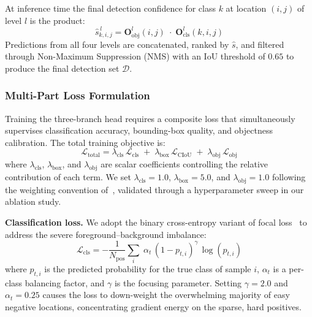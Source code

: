 At inference time the final detection confidence for class $k$
at location $(i,j)$ of level $l$ is the product:
\begin{equation}
    \hat{s}_{k,i,j}^{\,l} =
    \mathbf{O}_{\text{obj}}^{l}(i,j) \;\cdot\;
    \mathbf{O}_{\text{cls}}^{l}(k,i,j)
    \label{eq:conf}
\end{equation}
Predictions from all four levels are concatenated, ranked by
$\hat{s}$, and filtered through Non-Maximum Suppression (NMS)
with an IoU threshold of $0.65$ to produce the final detection
set $\mathcal{D}$.

\subsubsection{Multi-Part Loss Formulation}

Training the three-branch head requires a composite loss that
simultaneously supervises classification accuracy, bounding-box
quality, and objectness calibration.  The total training
objective is:
\begin{equation}
    \mathcal{L}_{\text{total}} =
    \lambda_{\text{cls}}\,\mathcal{L}_{\text{cls}}
    \;+\;
    \lambda_{\text{box}}\,\mathcal{L}_{\text{CIoU}}
    \;+\;
    \lambda_{\text{obj}}\,\mathcal{L}_{\text{obj}}
    \label{eq:total_loss}
\end{equation}
where $\lambda_{\text{cls}}$, $\lambda_{\text{box}}$, and
$\lambda_{\text{obj}}$ are scalar coefficients controlling the
relative contribution of each term.  We set
$\lambda_{\text{cls}} = 1.0$, $\lambda_{\text{box}} = 5.0$, and
$\lambda_{\text{obj}} = 1.0$ following the weighting convention
of~\cite{bochkovskiy2020yolov4}, validated through a
hyperparameter sweep in our ablation study.

\textbf{Classification loss.}  We adopt the binary
cross-entropy variant of focal loss~\cite{lin2017focal} to
address the severe foreground--background imbalance:
\begin{equation}
    \mathcal{L}_{\text{cls}} =
    -\frac{1}{N_{\text{pos}}}
    \sum_{i}\;
    \alpha_{t}\,(1 - p_{t,i})^{\gamma}\,
    \log(p_{t,i})
    \label{eq:focal}
\end{equation}
where $p_{t,i}$ is the predicted probability for the true class
of sample $i$, $\alpha_{t}$ is a per-class balancing factor,
and $\gamma$ is the focusing parameter.  Setting $\gamma = 2.0$
and $\alpha_{t} = 0.25$ causes the loss to down-weight the
overwhelming majority of easy negative locations, concentrating
gradient energy on the sparse, hard positives.

